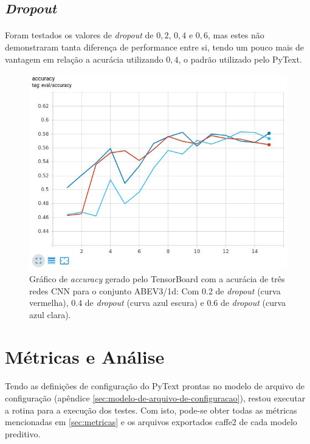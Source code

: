 \documentclass[grad,numbers]{coppe}
\begin{document}
		  \subsection{\textit{Dropout}}
			  \paragraph{}Foram testados os valores de \textit{dropout} de $0,2$, $0,4$ e $0,6$, mas estes não demonstraram tanta diferença de performance entre si, tendo um pouco mais de vantagem em relação a acurácia utilizando $0,4$, o padrão utilizado pelo PyText.
			  \begin{figure}[H]
			  	\centering
			  	{\includegraphics[width=13.5cm]{dropout-graph}
			  		\caption{Gráfico de \textit{accuracy} gerado pelo TensorBoard com a acurácia de três redes CNN para o conjunto ABEV3/1d: Com 0.2 de \textit{dropout} (curva vermelha), 0.4 de \textit{dropout} (curva azul escura) e 0.6 de \textit{dropout} (curva azul clara).}
			  		\label{fig:dropout-graph-fig}}
			  \end{figure}
 		\section{Métricas e Análise}
 			\paragraph{}Tendo as definições de configuração do PyText prontas no modelo de arquivo de configuração (apêndice \ref{sec:modelo-de-arquivo-de-configuracao}), restou executar a rotina para a execução dos testes. Com isto, pode-se obter todas as métricas mencionadas em \ref{sec:metricas} e os arquivos exportados caffe2 de cada modelo preditivo.
\end{document}
